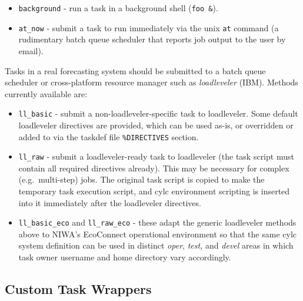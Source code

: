 \documentclass[11pt,a4paper]{article}
\begin{document}
\begin{itemize}

    \item \lstinline=background= - run a task in a background shell
        (\lstinline=foo &=). 

     \item \lstinline=at_now= - submit a task to run immediately via the
         unix \lstinline=at= command (a rudimentary batch queue
         scheduler that reports job output to the user by email).

\end{itemize}

Tasks in a real forecasting system should be submitted to a batch queue
scheduler or cross-platform resource manager such as {\em loadleveler}
(IBM). Methods currently available are:

\lstset{language=cylctaskdef}

\begin{itemize} 
    
    \item \lstinline=ll_basic= - submit a non-loadleveler-specific task
        to loadleveler. Some default loadleveler directives are
        provided, which can be used as-is, or overridden or added to
        via the taskdef file \lstinline=%DIRECTIVES= section.

    \item \lstinline=ll_raw= - submit a loadleveler-ready task to loadleveler (the task 
        script must contain all required directives already). This may be necessary for
        complex (e.g.\ multi-step) jobs. The original task script is copied to
        make the temporary task execution script, and cylc environment
        scripting is inserted into it immediately after the loadleveler directives.

    \item \lstinline=ll_basic_eco= and \lstinline=ll_raw_eco= - these
        adapt the generic loadleveler methods above to NIWA's EcoConnect
        operational environment so that the same cylc system definition
        can be used in distinct {\em oper}, {\em test,} and {\em devel}
        areas in which task owner username and home directory vary
        accordingly.

\end{itemize}

\subsection{Custom Task Wrappers}
\end{document}
